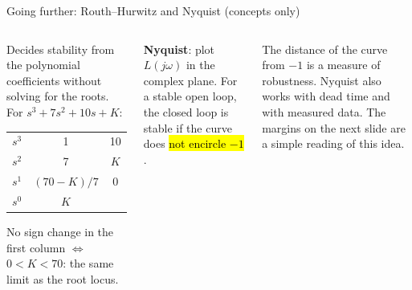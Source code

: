 \documentclass[aspectratio=169,10pt]{beamer}
\begin{document}
\begin{frame}{Going further: Routh--Hurwitz and Nyquist (concepts only)}
\begin{columns}[T]
\begin{defbox}
\footnotesize
Decides stability from the polynomial coefficients without solving for the roots. For $s^3+7s^2+10s+K$:
\begin{center}
\begin{tabular}{@{}c|cc@{}}
$s^3$ & 1 & 10\\
$s^2$ & 7 & $K$\\
$s^1$ & $(70-K)/7$ & 0\\
$s^0$ & $K$ & \\
\end{tabular}
\end{center}
No sign change in the first column $\iff$ $0<K<70$: the same limit as the root locus.
\end{defbox}
\begin{columns}[T]
\centering
{}
\footnotesize
\textbf{Nyquist}: plot $L(j\omega)$ in the complex plane. For a stable open loop, the closed loop is stable if the curve does \hl{not encircle $-1$}.
\end{columns}
\vspace{2mm}
\begin{notebox}
\raggedright
The distance of the curve from $-1$ is a measure of robustness. Nyquist also works with dead time and with measured data. The margins on the next slide are a simple reading of this idea.
\end{notebox}
\end{columns}
\end{frame}
\end{document}
